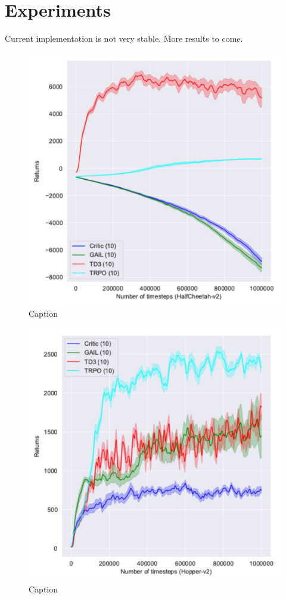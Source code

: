 \section{Experiments}
Current implementation is not very stable. More results to come. 

\begin{figure}
    \centering
    \includegraphics[width=.7\linewidth]{figures/HalfCheetah.pdf}
    \caption{Caption}
\end{figure}

\begin{figure}
    \centering
    \includegraphics[width=.7\linewidth]{figures/Hopper.pdf}
    \caption{Caption}
\end{figure}


